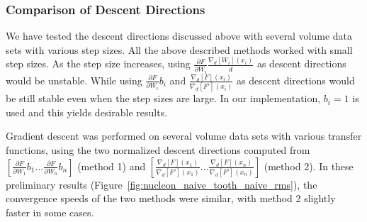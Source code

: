 \subsubsection{Comparison of Descent Directions}
We have tested the descent directions discussed above with several volume data sets with various step sizes.
All the above described methods worked with small step sizes. As the step size increases, using $ \frac{\partial F}{\partial W_{i}} \frac{\nabla_{d}[W_{i}](x_{i})}{d} $ as descent directions would be unstable. While using $ \frac{\partial F}{\partial W_{i}} b_{i} $ and $ \frac{ \nabla_{d}[F](x_{i}) }{ \nabla_{d}[F'](x_{i}) } $ as descent directions would be still stable even when the step sizes are large. In our implementation, $ b_{i}=1 $ is used and this yields desirable results.

Gradient descent was performed on several volume data sets with various transfer functions, using the two normalized descent directions computed from $ [ \frac{\partial F}{\partial W_{1}} b_{1} ... \frac{\partial F}{\partial W_{n}} b_{n} ] $ (method 1)
 and 
$ [ \frac{ \nabla_{d}[F](x_{1}) }{ \nabla_{d}[F'](x_{1}) }  ... \frac{ \nabla_{d}[F](x_{n}) }{ \nabla_{d}[F'](x_{n}) } ] $ (method 2).
In these preliminary results (Figure~\ref{fig:nucleon_naive_tooth_naive_rms}), the convergence speeds of the two methods were similar, with method 2 slightly faster in some cases.


